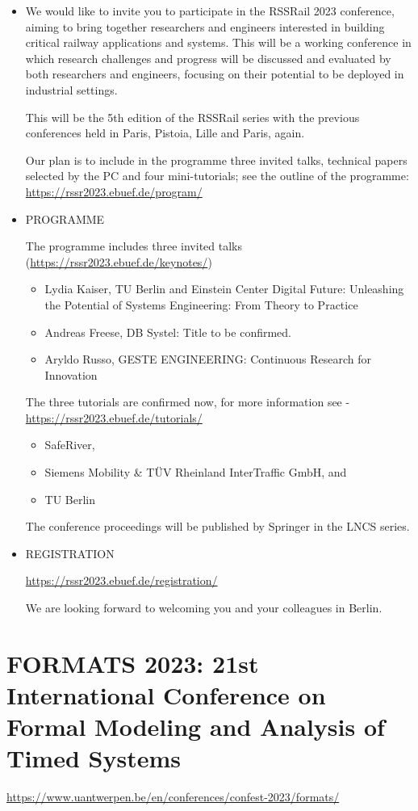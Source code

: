 \documentclass[prodmode,acmtecs]{acmsmall} %
\begin{document}
\begin{itemize}\item  We would like to invite you to participate in the RSSRail 2023 conference, aiming  to bring together researchers and engineers interested in building critical railway  applications and systems. This will be a working conference in which research  challenges and progress will be discussed and evaluated by both researchers  and engineers, focusing on their potential to be deployed in industrial settings.  
 
  This will be the 5th edition of the RSSRail series with the previous conferences held in Paris, Pistoia, Lille and Paris, again. 
 
  Our plan is to include in the programme three invited talks, technical papers  selected by the PC and four mini-tutorials; see the outline of the programme: \href{https://rssr2023.ebuef.de/program/}{https://rssr2023.ebuef.de/program/} 
 
\item  PROGRAMME 
 
  The programme includes three invited talks (\href{https://rssr2023.ebuef.de/keynotes/}{https://rssr2023.ebuef.de/keynotes/}) 
 
\begin{itemize}\item  Lydia Kaiser, TU Berlin and Einstein Center Digital Future: Unleashing the Potential of Systems Engineering: From Theory to Practice
\item  Andreas Freese, DB Systel: Title to be confirmed.
\item  Aryldo Russo, GESTE ENGINEERING: Continuous Research for Innovation
\end{itemize} 
 The three tutorials are confirmed now, for more information see - \href{https://rssr2023.ebuef.de/tutorials/}{https://rssr2023.ebuef.de/tutorials/} 
 
\begin{itemize}\item SafeRiver,
\item Siemens Mobility \& TÜV Rheinland InterTraffic GmbH, and
\item TU Berlin
\end{itemize} 
 The conference proceedings will be published by Springer in the LNCS series. 
 
\item  REGISTRATION 
 
  \href{https://rssr2023.ebuef.de/registration/}{https://rssr2023.ebuef.de/registration/}  
 
  We are looking forward to welcoming you and your colleagues in Berlin. 
 
\end{itemize}\section{FORMATS 2023: 21st International Conference on Formal Modeling and Analysis of Timed Systems}\label{FORMATS2023}  \href{https://www.uantwerpen.be/en/conferences/confest-2023/formats/}{https://www.uantwerpen.be/en/conferences/confest-2023/formats/}\\ 
\end{document}

